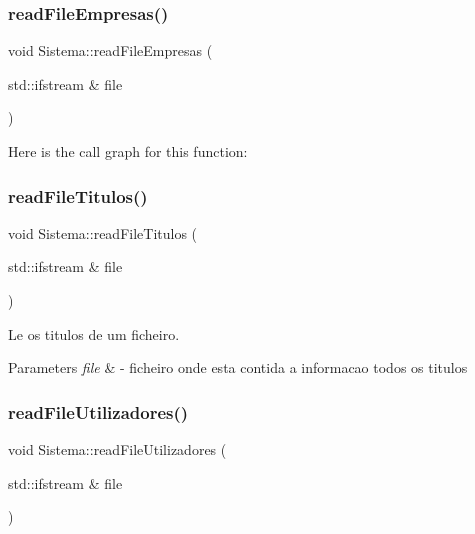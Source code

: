\subsubsection{\texorpdfstring{read\+File\+Empresas()}{readFileEmpresas()}}
{\footnotesize\ttfamily void Sistema\+::read\+File\+Empresas (\begin{DoxyParamCaption}\item[{std\+::ifstream \&}]{file }\end{DoxyParamCaption})}

Here is the call graph for this function\+:
\mbox{\label{class_sistema_a239cd36f933f0ba0bc36e47bd0012af0}} 
\subsubsection{\texorpdfstring{read\+File\+Titulos()}{readFileTitulos()}}
{\footnotesize\ttfamily void Sistema\+::read\+File\+Titulos (\begin{DoxyParamCaption}\item[{std\+::ifstream \&}]{file }\end{DoxyParamCaption})}



Le os titulos de um ficheiro. 


\begin{DoxyParams}{Parameters}
{\em file} & -\/ ficheiro onde esta contida a informacao todos os titulos \\
\hline
\end{DoxyParams}
\mbox{\label{class_sistema_afe05d538e95a0f26d0ddcfd2105de9d3}} 
\subsubsection{\texorpdfstring{read\+File\+Utilizadores()}{readFileUtilizadores()}}
{\footnotesize\ttfamily void Sistema\+::read\+File\+Utilizadores (\begin{DoxyParamCaption}\item[{std\+::ifstream \&}]{file }\end{DoxyParamCaption})}



